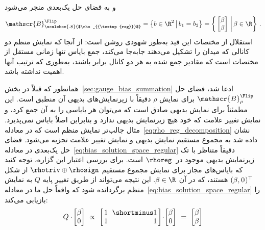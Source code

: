 و به فضای حل یک‌بعدی منجر می‌شود
\begin{align}\label{eq:bias_solution_space_regular}
	\mathscr{B}^{\Flip}_{\scalebox{.8}{$\rho_{{\textup{reg}}}$}} = 
	\big\{ b\in\R^2 \,\big|\, b_1=b_2 \big\} =
	\bigg\{ \begin{bmatrix} \beta \\ \beta \end{bmatrix} \,\bigg|\, \beta\in\R \bigg\} \ .
\end{align}
استقلال از مختصات این قید به‌طور شهودی روشن است:
از آنجا که نمایش منظم دو کانالی که میدان را تشکیل می‌دهند جابه‌جا می‌کند، جمع بایاس تنها زمانی مستقل از مختصات است که مقادیر جمع شده به هر دو کانال برابر باشند، به‌طوری که ترتیب آنها اهمیت نداشته باشد.

همانطور که قبلاً در بخش~\ref{sec:gauge_bias_summation} ادعا شد، فضای حل $\mathscr{B}^{\Flip}_\rho$ برای نمایش $\rho$ دقیقاً با زیرنمایش‌های بدیهی آن منطبق است.
این مطمئناً برای نمایش بدیهی صادق است که می‌توان هر بایاسی را به آن جمع کرد، و نمایش تغییر علامت که خود هیچ زیرنمایش بدیهی ندارد و بنابراین اصلاً بایاس نمی‌پذیرد.
مثال جالب‌تر نمایش منظم است که در معادله~\ref{eq:rho_reg_decomposition} نشان داده شد به مجموع مستقیم نمایش بدیهی و نمایش تغییر علامت تجزیه می‌شود.
فضای حل یک‌بعدی در معادله~\ref{eq:bias_solution_space_regular} دقیقاً متناظر با تک زیرنمایش بدیهی موجود در~$\rhoreg$ است.
برای بررسی اعتبار این گزاره، توجه کنید که بایاس‌های مجاز برای نمایش مجموع مستقیم $\rhotriv \oplus \rhosign$ از شکل $(\beta,\mkern1mu 0\mkern1mu)^\top$ هستند، که در آن $\beta\in\R$.
این نتیجه می‌تواند از طریق تغییر پایه $Q$ به نمایش منظم برگردانده شود که واقعاً حل ما در معادله~\eqref{eq:bias_solution_space_regular} را بازیابی می‌کند:
\begin{align}
	Q \cdot\mkern-2mu \begin{bmatrix} \beta \\ 0 \end{bmatrix}
	\ \propto\ 
	\begin{bmatrix} \hspace{1.5pt}
		1 &\mkern-7mu \shortminus1 \hspace*{1.5pt} \\ \hspace{1.5pt} 1 &\mkern-7mu \phantom{\shortminus}1 \hspace*{1.5pt}
	\end{bmatrix}
	\!\cdot\! \begin{bmatrix} \beta \\ 0 \end{bmatrix}
	\ =\ 
	\begin{bmatrix} \beta \\ \beta \end{bmatrix}
\end{align}